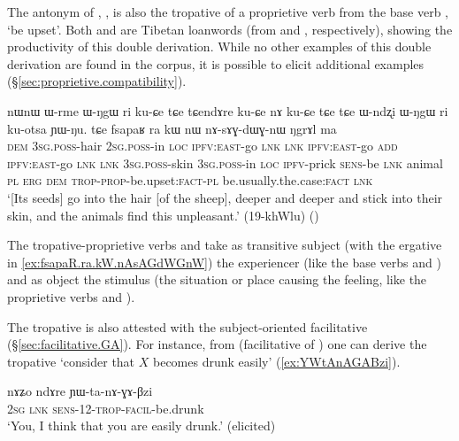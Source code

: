 The antonym of  , , is also the tropative of a proprietive verb  from the base verb , `be upset'. Both  and  are Tibetan loanwords (from  and , respectively), showing the productivity of this double derivation. While no other examples of this double derivation are found in the corpus, it is possible to elicit additional examples (§\ref{sec:proprietive.compatibility}).

\begin{exe}
\ex \label{ex:fsapaR.ra.kW.nAsAGdWGnW}
\gll nɯnɯ ɯ-rme ɯ-ŋgɯ ri ku-ɕe tɕe tɕendɤre ku-ɕe nɤ ku-ɕe tɕe tɕe ɯ-ndʐi ɯ-ŋgɯ ri ku-otsa ɲɯ-ŋu. tɕe fsapaʁ ra kɯ nɯ nɤ-sɤɣ-dɯɣ-nɯ ŋgrɤl ma \\
\textsc{dem} \textsc{3sg}.\textsc{poss}-hair \textsc{2sg}.\textsc{poss}-in \textsc{loc} \textsc{ipfv}:\textsc{east}-go \textsc{lnk} \textsc{lnk} \textsc{ipfv}:\textsc{east}-go \textsc{add} \textsc{ipfv}:\textsc{east}-go \textsc{lnk} \textsc{lnk} \textsc{3sg}.\textsc{poss}-skin \textsc{3sg}.\textsc{poss}-in \textsc{loc} \textsc{ipfv}-prick \textsc{sens}-be \textsc{lnk} animal \textsc{pl} \textsc{erg} \textsc{dem} \textsc{trop}-\textsc{prop}-be.upset:\textsc{fact}-\textsc{pl} be.usually.the.case:\textsc{fact} \textsc{lnk} \\
\glt `[Its seeds] go into the hair [of the sheep], deeper and deeper and stick into their skin, and the animals find this unpleasant.' (19-khWlu)
()
\end{exe}

The tropative-proprietive verbs  and  take as transitive subject (with the ergative in \ref{ex:fsapaR.ra.kW.nAsAGdWGnW}) the experiencer (like the base verbs  and ) and as object the stimulus (the situation or place causing the feeling, like the proprietive verbs  and ).

The tropative is also attested with the subject-oriented facilitative  (§\ref{sec:facilitative.GA}). For instance, from  (facilitative of ) one can derive the tropative  `consider that $X$ becomes drunk easily' (\ref{ex:YWtAnAGABzi}).

\begin{exe}
\ex \label{ex:YWtAnAGABzi}
\gll nɤʑo ndɤre ɲɯ-ta-nɤ-ɣɤ-βzi  \\
\textsc{2sg} \textsc{lnk} \textsc{sens}-1\fl{}2-\textsc{trop}-\textsc{facil}-be.drunk \\
\glt `You, I think that you are easily drunk.' (elicited)
\end{exe}

